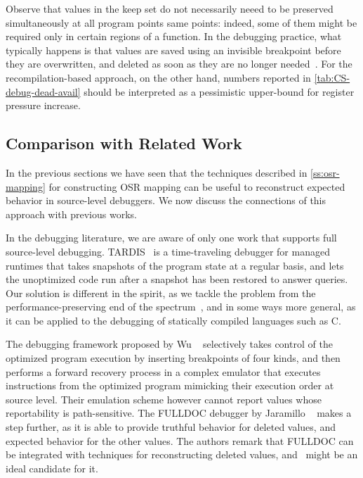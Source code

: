 Observe that values in the keep set do not necessarily neeed to be preserved simultaneously at all program points same points: indeed, some of them might be required only in certain regions of a function. In the debugging practice, what typically happens is that values are saved using an invisible breakpoint before they are overwritten, and deleted as soon as they are no longer needed~\cite{Jaramillo00}. For the recompilation-based approach, on the other hand, numbers reported in \mytable\ref{tab:CS-debug-dead-avail} should be interpreted as a pessimistic upper-bound for register pressure increase.

\subsection{Comparison with Related Work}
In the previous sections we have seen that the techniques described in \mysection\ref{ss:osr-mapping} for constructing OSR mapping can be useful to reconstruct expected behavior in source-level debuggers. We now discuss the connections of this approach with previous works.

In the debugging literature, we are aware of only one work that supports full source-level debugging. TARDIS~\cite{Barr14} is a time-traveling debugger for managed runtimes that takes snapshots of the program state at a regular basis, and lets the unoptimized code run after a snapshot has been restored to answer queries. Our solution is different in the spirit, as we tackle the problem from the performance-preserving end of the spectrum~\cite{Adl-Tabatabai96thesis}, and in some ways more general, as it can be applied to the debugging of statically compiled languages such as C.

The debugging framework proposed by Wu \etal~\cite{Wu99} selectively takes control of the optimized program execution by inserting breakpoints of four kinds, and then performs a forward recovery process in a complex emulator that executes instructions from the optimized program mimicking their execution order at source level. Their emulation scheme however cannot report values whose reportability is path-sensitive. The FULLDOC debugger by Jaramillo \etal~\cite{Jaramillo00} makes a step further, as it is able to provide truthful behavior for deleted values, and expected behavior for the other values. The authors remark that FULLDOC can be integrated with techniques for reconstructing deleted values, and \buildcomp\ might be an ideal candidate for it.

